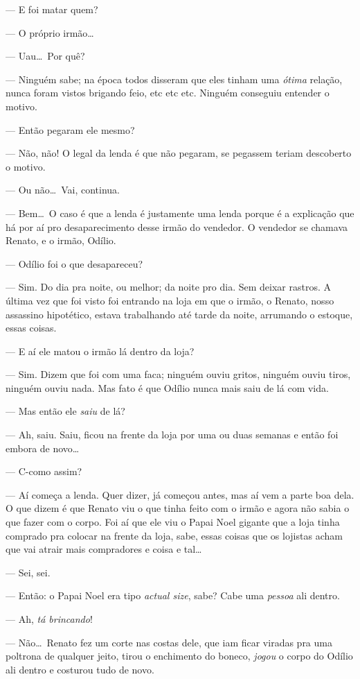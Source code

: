--- E foi matar quem?

--- O próprio irmão\ldots

--- Uau\ldots \ Por quê?

--- Ninguém sabe; na época todos disseram que eles tinham uma \emph{ótima} relação, nunca foram vistos brigando feio, etc etc etc. Ninguém conseguiu entender o motivo.

--- Então pegaram ele mesmo?

--- Não, não! O legal da lenda é que não pegaram, se pegassem teriam descoberto o motivo.

--- Ou não\ldots \ Vai, continua.

--- Bem\ldots \ O caso é que a lenda é justamente uma lenda porque é a explicação que há por aí pro desaparecimento desse irmão do vendedor. O vendedor se chamava Renato, e o irmão, Odílio.

--- Odílio foi o que desapareceu?

--- Sim. Do dia pra noite, ou melhor; da noite pro dia. Sem deixar rastros. A última vez que foi visto foi entrando na loja em que o irmão, o Renato, nosso assassino hipotético, estava trabalhando até tarde da noite, arrumando o estoque, essas coisas.

--- E aí ele matou o irmão lá dentro da loja?

--- Sim. Dizem que foi com uma faca; ninguém ouviu gritos, ninguém ouviu tiros, ninguém ouviu nada. Mas fato é que Odílio nunca mais saiu de lá com vida.

--- Mas então ele \emph{saiu} de lá?

--- Ah, saiu. Saiu, ficou na frente da loja por uma ou duas semanas e então foi embora de novo\ldots

--- C-como assim?

--- Aí começa a lenda. Quer dizer, já começou antes, mas aí vem a parte boa dela. O que dizem é que Renato viu o que tinha feito com o irmão e agora não sabia o que fazer com o corpo. Foi aí que ele viu o Papai Noel gigante que a loja tinha comprado pra colocar na frente da loja, sabe, essas coisas que os lojistas acham que vai atrair mais compradores e coisa e tal\ldots

--- Sei, sei.

--- Então: o Papai Noel era tipo \emph{actual size}, sabe? Cabe uma \emph{pessoa} ali dentro.

--- Ah, \emph{tá brincando}!

--- Não\ldots \ Renato fez um corte nas costas dele, que iam ficar viradas pra uma poltrona de qualquer jeito, tirou o enchimento do boneco, \emph{jogou} o corpo do Odílio ali dentro e costurou tudo de novo.

